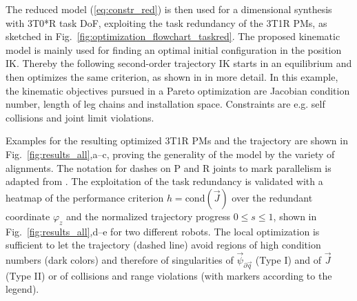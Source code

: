 \documentclass[
	graybox,
	vecphys] %
	{svmult}
\newcommand{\vecResR}[0]{\vec{\psi}}
\begin{document}
The reduced model (\ref{eq:constr_red}) is then used for a dimensional synthesis with 3T0*R task DoF, exploiting the task redundancy of the 3T1R PMs, as sketched in Fig.~\ref{fig:optimization_flowchart_taskred}.
The proposed kinematic model is mainly used for finding an optimal initial configuration in the position IK.
Thereby the following second-order trajectory IK starts in an equilibrium and then optimizes the same criterion, as shown in \cite{SchapplerOrt2021} in more detail.
In this example, the kinematic objectives pursued in a Pareto optimization are Jacobian condition number, length of leg chains and installation space.
Constraints are e.g. self collisions and joint limit violations.



Examples for the resulting optimized 3T1R PMs and the trajectory are shown in Fig.~\ref{fig:results_all},a--c, proving the generality of the model by the variety of alignments.
The notation for dashes on P and R joints to mark parallelism is adapted from \cite{KongGos2007}.
The exploitation of the task redundancy is validated with a heatmap of the performance criterion $h{=}\mathrm{cond}(\vec{J})$ over the redundant coordinate $\varphi_z$ and the normalized trajectory progress $0 {\le} s {\le} 1$, shown in Fig.~\ref{fig:results_all},d--e for two different robots.
The local optimization is sufficient to let the trajectory (dashed line) avoid regions of high condition numbers (dark colors) and therefore of singularities of $\vecResR_{\partial \vec{q}}$ (Type I) and of $\vec{J}$ (Type II) or of collisions and range violations (with markers according to the legend).

\end{document}
